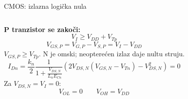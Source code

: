 \begin{frame}[label=09_2-s035]{CMOS: izlazna logička nula}
\begin{columns}[T,onlytextwidth]\centering {}\textbf{P tranzistor se zakoči:}\[V_I\ge V_{DD}+V_{Tp}\]
\[V_{GS,P}=V_{G,P}-V_{S,P}=V_I-V_{DD}\]
$V_{GS,P}\geq V_{Tp}$. N je omski; neopterećen izlaz daje nultu struju.\[I_{Dn}=\frac{k_n}2\frac1{1+\frac{V_{DS,N}}{L_nE_{Cn}}}\left(2V_{DS,N}(V_{GS,N}-V_{Tn})-V_{DS,N}^2\right)=0\]
Za $V_{DS,N}=V_I=0$:\[V_{OL}=0\qquad V_{OH}=V_{DD}\]
\end{columns}
\end{frame}
